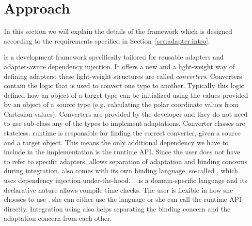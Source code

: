 \section{Approach}
\label{sec:adapter:approach}
In this section we will explain the details of the \zamk framework which is designed according to the requirements specified in Section~\ref{sec:adapter:intro}. 

\zamk is a development framework specifically tailored for reusable adapters and adapter-aware dependency injection. 
It offers a new and a light-weight way of defining adapters; these light-weight structures are called \emph{converters}. 
Converters contain the logic that is used to convert one type to another. 
Typically this logic defined how an object of a target type can be initialized using the values provided by an object of a source type (e.g. calculating the polar coordinate values from Cartesian values). 
Converters are provided by the developer and they do not need to use sub-class any of the types to implement adaptations. Converter classes are stateless. 
\zamk runtime is responsible for finding the correct converter, given a source and a target object. 
This means the only additional dependency we have to include in the implementation is the \zamk runtime API. 
Since the user does not have to refer to specific adapters, \zamk allows separation of adaptation and binding concerns during integration.
\zamk also comes with its own binding language, so-called \gluer, which uses dependency injection under-the-hood. 
\gluer~ is a domain-specific language and its declarative nature allows compile-time checks.
The user is flexible in how she chooses to use \zamk, she can either use the \gluer language or she can call the runtime API directly. 
Integration using \zamk also helps separating the binding concern and the adaptation concern from each other.  

